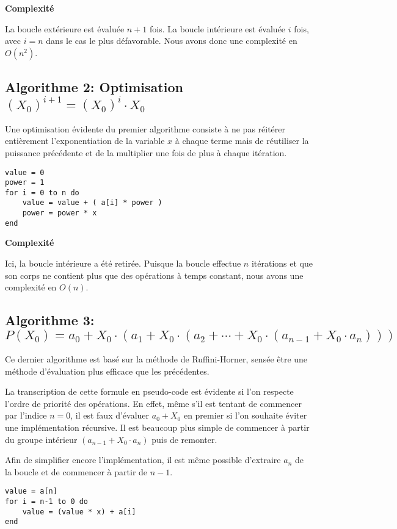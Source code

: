 \documentclass[11pt,a4paper]{article}
\begin{document}
\textbf{Complexité}

La boucle extérieure est évaluée $n+1$ fois. La boucle intérieure est évaluée $i$ fois, avec $i = n$ dans le cas le plus défavorable. Nous avons donc une complexité en $O(n^{2})$.

\subsection{Algorithme 2: Optimisation $ (X_{0})^{i+1} = (X_{0})^{i} \cdot X_{0} $}

Une optimisation évidente du premier algorithme consiste à ne pas réitérer entièrement l'exponentiation de la variable $x$ à chaque terme mais de réutiliser la puissance précédente et de la multiplier une fois de plus à chaque itération.

\vspace{1em} \begin{lstlisting}
value = 0
power = 1
for i = 0 to n do
	value = value + ( a[i] * power )
	power = power * x
end
\end{lstlisting}

\textbf{Complexité}

Ici, la boucle intérieure a été retirée. Puisque la boucle effectue $n$ itérations et que son corps ne contient plus que des opérations à temps constant, nous avons une complexité en $O(n)$.

\subsection{Algorithme 3: $ P(X_{0}) = a_{0} + X_{0} \cdot (a_{1} + X_{0} \cdot (a_{2} + \cdots + X_{0} \cdot (a_{n-1} + X_{0} \cdot a_{n}))) $}

Ce dernier algorithme est basé sur la méthode de Ruffini-Horner, sensée être une méthode d'évaluation plus efficace que les précédentes.

La transcription de cette formule en pseudo-code est évidente si l'on respecte l'ordre de priorité des opérations. En effet, même s'il est tentant de commencer par l'indice $n = 0$, il est faux d'évaluer $a_{0} + X_{0}$ en premier si l'on souhaite éviter une implémentation récursive. Il est beaucoup plus simple de commencer à partir du groupe intérieur $(a_{n-1} + X_{0} \cdot a_{n})$ puis de remonter. 

Afin de simplifier encore l'implémentation, il est même possible d'extraire $a_{n}$ de la boucle et de commencer à partir de $n-1$.

\vspace{1em} \begin{lstlisting}
value = a[n]
for i = n-1 to 0 do
	value = (value * x) + a[i]
end
\end{lstlisting}
\end{document}
